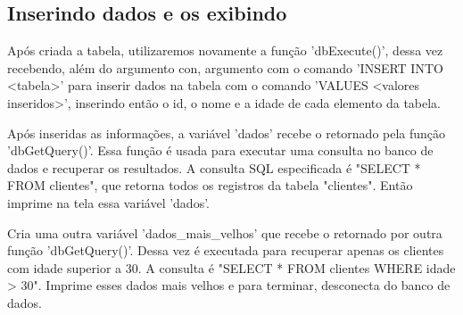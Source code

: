     \subsection{Inserindo dados e os exibindo}
    Após criada a tabela, utilizaremos novamente a função 'dbExecute()', dessa vez recebendo, além do argumento con, argumento com o comando 'INSERT INTO <tabela>' para inserir dados na tabela com o comando 'VALUES <valores inseridos>', inserindo então o id, o nome e a idade de cada elemento da tabela.\par Após inseridas as informações, a variável 'dados' recebe o retornado pela função 'dbGetQuery()'. Essa função é usada para executar uma consulta no banco de dados e recuperar os resultados. A consulta SQL especificada é "SELECT * FROM clientes", que retorna todos os registros da tabela "clientes". Então imprime na tela essa variável 'dados'.\par Cria uma outra variável 'dados\_mais\_velhos' que recebe o retornado por outra função 'dbGetQuery()'. Dessa vez é executada para recuperar apenas os clientes com idade superior a 30. A consulta é "SELECT * FROM clientes WHERE idade > 30". Imprime esses dados mais velhos e para terminar, desconecta do banco de dados.
    
